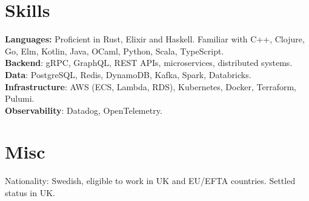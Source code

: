 \documentclass[margin,line]{res}
\begin{document}
\begin{resume}
      \section{\sc Skills}

       {\bf Languages:} Proficient in Rust, Elixir and Haskell. Familiar
      with C++, Clojure, Go, Elm, Kotlin, Java, OCaml, Python, Scala, TypeScript.\\
      {\bf Backend}: gRPC, GraphQL, REST APIs, microservices, distributed systems.\\
      {\bf Data}: PostgreSQL, Redis, DynamoDB, Kafka, Spark, Databricks.\\
      {\bf Infrastructure}: AWS (ECS, Lambda, RDS), Kubernetes, Docker, Terraform, Pulumi.\\
      {\bf Observability}: Datadog, OpenTelemetry.

      \section{\sc Misc}

      Nationality: Swedish, eligible to work in UK and EU/EFTA countries. Settled status in UK.

\end{resume}
\end{document}
